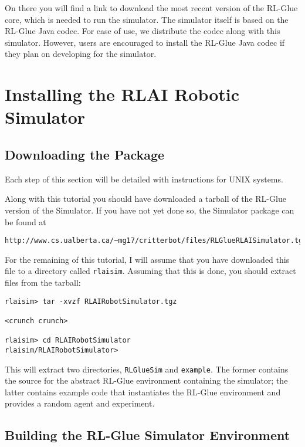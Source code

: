 \documentclass[12pt]{article}
\newcommand{\code}[1]{\texttt{#1}}
\begin{document}
On there you will find a link to download the most recent version of the RL-Glue
core, which is needed to run the simulator. The simulator itself is based
on the RL-Glue Java codec. For ease of use, we distribute the codec along
with this simulator. However, users are encouraged to install the RL-Glue
Java codec if they plan on developing for the simulator. 

\section{Installing the RLAI Robotic Simulator}\label{sec:installation}

\subsection{Downloading the Package}

Each step of this section will be detailed with instructions for UNIX
systems. 

Along with this tutorial you should have downloaded a tarball of the 
RL-Glue version of the Simulator. If you have not yet done so, the Simulator
package can be found at

\begin{verbatim}
http://www.cs.ualberta.ca/~mg17/critterbot/files/RLGlueRLAISimulator.tgz
\end{verbatim}

For the remaining of this tutorial, I will assume that you have downloaded
this file to a directory called \verb+rlaisim+. Assuming that this 
is done, you should extract files from the tarball:

\begin{verbatim}
rlaisim> tar -xvzf RLAIRobotSimulator.tgz

<crunch crunch>

rlaisim> cd RLAIRobotSimulator
rlaisim/RLAIRobotSimulator>
\end{verbatim}

This will extract two directories, \code{RLGlueSim} and \code{example}.
The former contains the source for the abstract RL-Glue environment containing
the simulator; the latter contains example code that instantiates the
RL-Glue environment and provides a random agent and experiment.

\subsection{Building the RL-Glue Simulator Environment}
\end{document}
